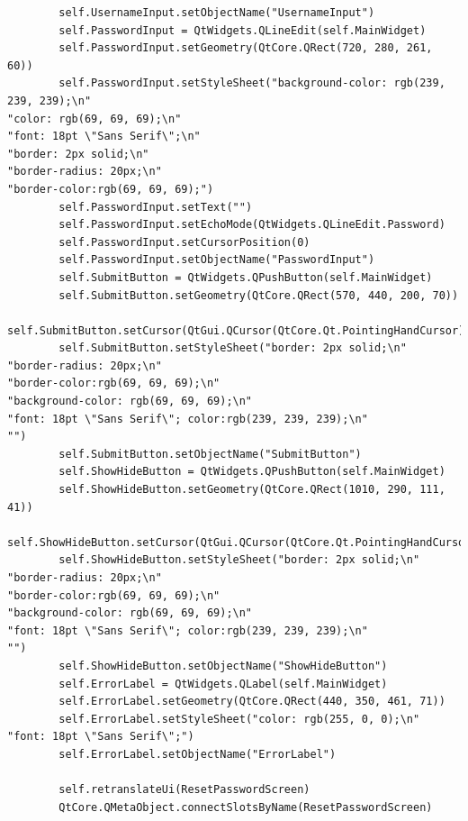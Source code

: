 \documentclass{article}
\begin{document}
\begin{lstlisting}
        self.UsernameInput.setObjectName("UsernameInput")
        self.PasswordInput = QtWidgets.QLineEdit(self.MainWidget)
        self.PasswordInput.setGeometry(QtCore.QRect(720, 280, 261, 60))
        self.PasswordInput.setStyleSheet("background-color: rgb(239, 239, 239);\n"
"color: rgb(69, 69, 69);\n"
"font: 18pt \"Sans Serif\";\n"
"border: 2px solid;\n"
"border-radius: 20px;\n"
"border-color:rgb(69, 69, 69);")
        self.PasswordInput.setText("")
        self.PasswordInput.setEchoMode(QtWidgets.QLineEdit.Password)
        self.PasswordInput.setCursorPosition(0)
        self.PasswordInput.setObjectName("PasswordInput")
        self.SubmitButton = QtWidgets.QPushButton(self.MainWidget)
        self.SubmitButton.setGeometry(QtCore.QRect(570, 440, 200, 70))
        self.SubmitButton.setCursor(QtGui.QCursor(QtCore.Qt.PointingHandCursor))
        self.SubmitButton.setStyleSheet("border: 2px solid;\n"
"border-radius: 20px;\n"
"border-color:rgb(69, 69, 69);\n"
"background-color: rgb(69, 69, 69);\n"
"font: 18pt \"Sans Serif\"; color:rgb(239, 239, 239);\n"
"")
        self.SubmitButton.setObjectName("SubmitButton")
        self.ShowHideButton = QtWidgets.QPushButton(self.MainWidget)
        self.ShowHideButton.setGeometry(QtCore.QRect(1010, 290, 111, 41))
        self.ShowHideButton.setCursor(QtGui.QCursor(QtCore.Qt.PointingHandCursor))
        self.ShowHideButton.setStyleSheet("border: 2px solid;\n"
"border-radius: 20px;\n"
"border-color:rgb(69, 69, 69);\n"
"background-color: rgb(69, 69, 69);\n"
"font: 18pt \"Sans Serif\"; color:rgb(239, 239, 239);\n"
"")
        self.ShowHideButton.setObjectName("ShowHideButton")
        self.ErrorLabel = QtWidgets.QLabel(self.MainWidget)
        self.ErrorLabel.setGeometry(QtCore.QRect(440, 350, 461, 71))
        self.ErrorLabel.setStyleSheet("color: rgb(255, 0, 0);\n"
"font: 18pt \"Sans Serif\";")
        self.ErrorLabel.setObjectName("ErrorLabel")

        self.retranslateUi(ResetPasswordScreen)
        QtCore.QMetaObject.connectSlotsByName(ResetPasswordScreen)


\end{lstlisting}
\end{document}
